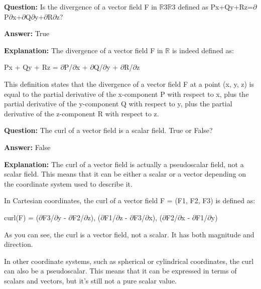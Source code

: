 \documentclass{article}
\begin{document}
                \vspace{0.5cm} 
        
            
                \textbf {Question:} Is the divergence of a vector field F in \ensuremath{\mathbb{R}}3\ensuremath{\mathbb{R}}3 defined as Px+Qy+Rz=\ensuremath{\partial}P\ensuremath{\partial}x+\ensuremath{\partial}Q\ensuremath{\partial}y+\ensuremath{\partial}R\ensuremath{\partial}z?
                
                \textbf{Answer:} True

                \textbf{Explanation:} The divergence of a vector field F in \ensuremath{\mathbb{R}}{\textthreesuperior} is indeed defined as:

Px + Qy + Rz = \ensuremath{\partial}P/\ensuremath{\partial}x + \ensuremath{\partial}Q/\ensuremath{\partial}y + \ensuremath{\partial}R/\ensuremath{\partial}z

This definition states that the divergence of a vector field F at a point (x, y, z) is equal to the partial derivative of the x-component P with respect to x, plus the partial derivative of the y-component Q with respect to y, plus the partial derivative of the z-component R with respect to z.
                
                \vspace{0.5cm} 
        
            
                \textbf {Question:} The curl of a vector field is a scalar field. True or False?
                
                \textbf{Answer:} False

                \textbf{Explanation:} The curl of a vector field is actually a pseudoscalar field, not a scalar field. This means that it can be either a scalar or a vector depending on the coordinate system used to describe it.

In Cartesian coordinates, the curl of a vector field F = (F1, F2, F3) is defined as:

curl(F) = (\ensuremath{\partial}F3/\ensuremath{\partial}y - \ensuremath{\partial}F2/\ensuremath{\partial}z), (\ensuremath{\partial}F1/\ensuremath{\partial}z - \ensuremath{\partial}F3/\ensuremath{\partial}x), (\ensuremath{\partial}F2/\ensuremath{\partial}x - \ensuremath{\partial}F1/\ensuremath{\partial}y)

As you can see, the curl is a vector field, not a scalar. It has both magnitude and direction.

In other coordinate systems, such as spherical or cylindrical coordinates, the curl can also be a pseudoscalar. This means that it can be expressed in terms of scalars and vectors, but it's still not a pure scalar value.
\end{document}
